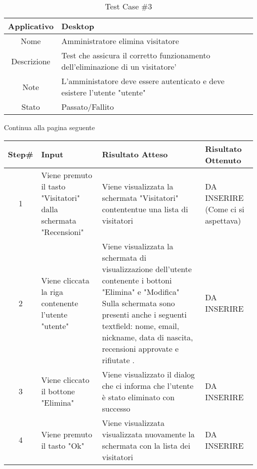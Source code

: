 
\begin{table}[H]
    \centering
    \footnotesize
    \caption{Test Case \#3}
    \begin{tabularx}{\textwidth}{|c|X|}
        \hline
        Applicativo & Desktop\\
        \hline
        Nome & Amministratore elimina visitatore  \\
        \hline
        Descrizione & Test che assicura il corretto funzionamento dell'eliminazione di un visitatore'\\
        \hline
        Note & L'amministatore deve essere autenticato e deve esistere l'utente "utente"  \\
        \hline
        Stato & Passato/Fallito\\
        \hline

    \end{tabularx}
    Continua alla pagina seguente
    \setlength{\tabcolsep}{8pt}
    \renewcommand{\arraystretch}{1.5}
\end{table}
\begin{table}[H]
    \footnotesize
    \begin{tabularx}{\textwidth}{|c|X|X|X|}
        \hline
        Step\# & Input & Risultato Atteso & Risultato Ottenuto \\
        \hline
         1 & Viene premuto il tasto "Visitatori" dalla schermata "Recensioni" 
         & Viene visualizzata la schermata "Visitatori" contententue una lista di visitatori
         &DA INSERIRE (Come ci si aspettava)\\
          \hline
        2 & Viene cliccata la riga contenente l'utente "utente"
        & Viene visualizzata la schermata di visualizzazione dell'utente contenente i bottoni "Elimina" e "Modifica"
          Sulla schermata sono presenti anche i seguenti textfield: nome, email, nickname, data di nascita, recensioni approvate e rifiutate .
        & DA INSERIRE\\
         \hline 
        3 & Viene cliccato il bottone "Elimina"
         & Viene visualizzato il dialog che ci informa che l'utente è stato eliminato con successo
         & DA INSERIRE\\
          \hline
          4 & Viene premuto il tasto "Ok"
         & Viene visualizzata visualizzata nuovamente la schermata con la lista dei visitatori
         & DA INSERIRE\\
          \hline      
    \end{tabularx}
\end{table}
    
       
